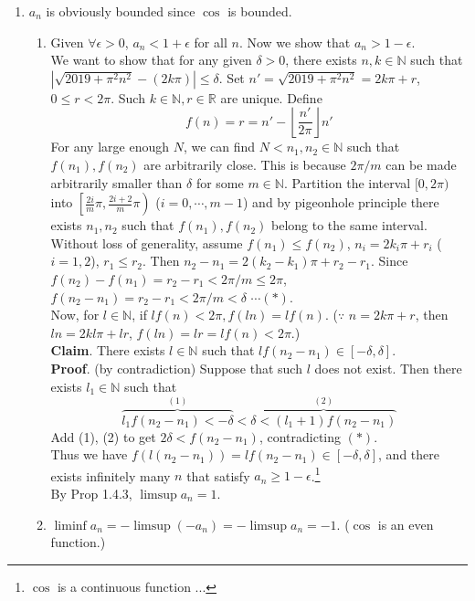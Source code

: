 \documentclass[12pt]{report}
\newcommand{\bb}[1]{\mathbb{#1}}
\newcommand{\abs}[1]{\left|#1\right|}
\begin{document}
\begin{enumerate}
\begin{enumerate}
	\item $a_n$ is obviously bounded since $\cos$ is bounded.
	\begin{enumerate}
		\item Given $\forall \epsilon > 0$, $a_n < 1+\epsilon$ for all $n$. Now we show that $a_n > 1-\epsilon$.\\
		We want to show that for any given $\delta > 0$, there exists $n, k\in \bb{N}$ such that $\abs{\sqrt{2019+\pi^2n^2} - (2k\pi)} \leq \delta$.
		Set $n' = \sqrt{2019+\pi^2n^2} = 2k\pi + r$, $0\leq r < 2\pi$. Such $k\in \bb{N}, r\in\bb{R}$ are unique.
		Define $$f(n) = r = n' - \left \lfloor\frac{n'}{2\pi}\right \rfloor n'$$For any large enough $N$, we can find $N < n_1, n_2\in\bb{N}$ such that $f(n_1), f(n_2)$ are arbitrarily close. This is because $2\pi/m$ can be made arbitrarily smaller than $\delta$ for some $m\in \bb{N}$. Partition the interval $[0, 2\pi)$ into $\left [\frac{2i}{m}\pi, \frac{2i+2}{m}\pi\right )$ ($i=0, \cdots, m-1$) and by pigeonhole principle there exists $n_1, n_2$ such that $f(n_1), f(n_2)$ belong to the same interval.\\
		Without loss of generality, assume $f(n_1)\leq f(n_2)$, $n_i = 2k_i\pi + r_i$ ($i=1, 2$), $r_1\leq r_2$. Then $n_2-n_1 = 2(k_2-k_1)\pi + r_2-r_1$. Since $f(n_2)-f(n_1) = r_2 - r_1 < 2\pi/m \leq 2\pi$, $f(n_2-n_1) = r_2-r_1 < 2\pi/m < \delta$ $\cdots (*)$.\\Now, for $l\in \bb{N}$, if $lf(n) < 2\pi, f(ln)= lf(n)$. ($\because$ $n = 2k\pi + r$, then $ln = 2kl\pi+lr$, $f(ln) = lr = lf(n) < 2\pi$.)\\
		\textbf{Claim}. There exists $l\in\bb{N}$ such that $lf(n_2-n_1) \in \left[- \delta, \delta \right]$.\\
		\textbf{Proof}. (by contradiction) Suppose that such $l$ does not exist. Then there exists $l_1\in \bb{N}$ such that $$\overset{(1)}{\overbrace{l_1f(n_2-n_1) < -\delta}}<\overset{(2)}{\overbrace{\delta < (l_1+1)f(n_2-n_1)}}$$
		Add (1), (2) to get $2\delta < f(n_2-n_1)$, contradicting $(*)$.\\
		Thus we have $f(l(n_2-n_1)) = lf(n_2-n_1) \in \left[-\delta, \delta\right]$, and there exists infinitely many $n$ that satisfy $a_n\geq 1-\epsilon$.\footnote{$\cos$ is a continuous function ...} 
		\\By \textsf{Prop 1.4.3}, $\limsup a_n = 1$.
		
		\item $\liminf a_n = -\limsup (-a_n) = -\limsup a_n = -1$. ($\cos$ is an even function.)
	\end{enumerate}
\end{enumerate}


\end{enumerate}
\end{document}
